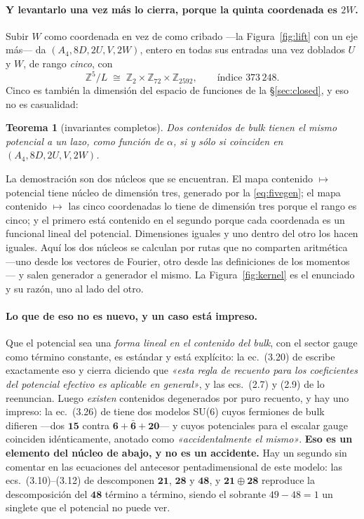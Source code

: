 \documentclass[11pt,a4paper]{article}
\newtheorem{theorem}{Teorema}
\newcommand{\ZZ}{\mathbb{Z}}
\newcommand{\rep}[1]{\mathbf{#1}}
\begin{document}
\paragraph{Y levantarlo una vez más lo cierra, porque la quinta coordenada es $2W$.} Subir $W$ como
coordenada en vez de como cribado ---la Figura~\ref{fig:lift} con un eje más--- da
$(A_4,8D,2U,V,2W)$, entero en todas sus entradas una vez
doblados $U$ y $W$, de rango \emph{cinco}, con
\begin{equation}\label{eq:snf5}
  \ZZ^5/L\;\cong\;\ZZ_2\times\ZZ_{72}\times\ZZ_{2592},\qquad\text{índice }373\,248 .
\end{equation}
Cinco es también la dimensión del espacio de funciones de la \S\ref{sec:closed}, y eso no es
casualidad:
\begin{theorem}[invariantes completos]\label{thm:complete}
Dos contenidos de bulk tienen el mismo potencial a un lazo, como función de $\alpha$, si y sólo si
coinciden en $(A_4,8D,2U,V,2W)$.
\end{theorem}
\noindent La demostración son dos núcleos que se encuentran. El mapa contenido $\mapsto$ potencial
tiene núcleo de dimensión tres, generado por la \eqref{eq:fivegen}; el mapa contenido $\mapsto$ las
cinco coordenadas lo tiene de dimensión tres porque el rango es cinco; y el primero está contenido
en el segundo porque cada coordenada es un funcional lineal del potencial. Dimensiones iguales y uno
dentro del otro los hacen iguales. Aquí los dos núcleos se calculan por rutas que no comparten
aritmética ---uno desde los vectores de Fourier, otro desde las definiciones de los momentos--- y
salen generador a generador el mismo. La Figura~\ref{fig:kernel} es el enunciado y su razón, uno al
lado del otro.

\paragraph{Lo que de eso no es nuevo, y un caso está impreso.} Que el potencial sea una \emph{forma
lineal en el contenido del bulk}, con el sector gauge como término constante, es estándar y está
explícito: la ec.~(3.20) de \cite{HY04} escribe exactamente eso y cierra diciendo que \emph{«esta
regla de recuento para los coeficientes del potencial efectivo es aplicable en general»}, y las
ecs.~(2.7) y (2.9) de \cite{CCD24} lo reenuncian. Luego \emph{existen} contenidos degenerados por
puro recuento, y hay uno impreso: la ec.~(3.26) de \cite{CCD24} tiene dos modelos SU(6) cuyos
fermiones de bulk difieren ---dos $\rep{15}$ contra $\rep6+\rep{\bar6}+\rep{20}$--- y cuyos
potenciales para el escalar gauge coinciden idénticamente, anotado como \emph{«accidentalmente el
mismo»}. \textbf{Eso es un elemento del núcleo de abajo, y no es un accidente.} Hay un segundo sin
comentar en las ecuaciones del antecesor pentadimensional de este modelo: las ecs.~(3.10)--(3.12)
de \cite{KTY17} descomponen $\rep{21}$, $\rep{28}$ y $\rep{48}$, y $\rep{21}\oplus\rep{28}$
reproduce la descomposición del $\rep{48}$ término a término, siendo el sobrante $49-48=1$ un
singlete que el potencial no puede ver.
\end{document}
